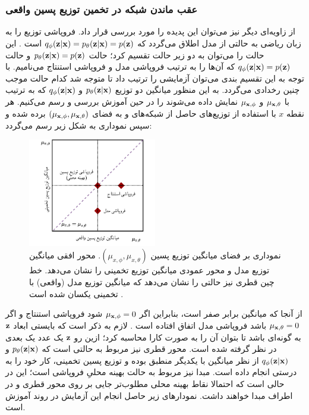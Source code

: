 \subsubsection{عقب ماندن شبکه
	\encoder{}
	در تخمین توزیع پسین واقعی}
از زاویه‌ای دیگر نیز می‌توان این پدیده را مورد بررسی قرار داد. فروپاشی توزیع \posterior{} را به زبان ریاضی به حالتی از مدل اطلاق می‌گردد که
$q_\phi({\bf z}|{\bf x}) = p_\theta ({\bf z}|{\bf x}) = p({\bf z})$
است \cite{vae_lagging}. این حالت را می‌توان به دو زیر حالت تقسیم کرد؛ حالت $p_\theta({\bf z}|{\bf x}) = p({\bf z})$ و حالت $q_\phi({\bf z}|{\bf x}) = p({\bf z})$ که آن‌ها را به ترتیب فروپاشی مدل و فروپاشی استنتاج می‌نامیم. با توجه به این تقسیم بندی می‌توان آزمایشی را ترتیب داد تا متوجه شد کدام حالت موجب چنین رخدادی می‌گردد. به این منظور میانگین دو توزیع $p_\theta({\bf z}|{\bf x})$ و $q_\phi({\bf z}|{\bf x})$ که به ترتیب با $\mu_{{\bf x},\theta}$ و $\mu_{{\bf x},\phi}$ نمایش داده می‌شوند را در حین آموزش بررسی و رسم می‌کنیم. هر نقطه $x$ با استفاده از توزیع‌های حاصل از شبکه‌های \encoder{} و \decoder{} به فضای
$(\mu_{{\bf x},\phi}, \mu_{{\bf x},\theta})$
برده شده و سپس نموداری به شکل زیر رسم می‌گردد:
\begin{figure}[H]
	\centering
	\includegraphics[width=0.5\textwidth]{images/lagging1.pdf}
	\caption{
		نموداری بر فضای میانگین توزیع پسین $(\mu_{x,\phi}, \mu_{x,\theta})$. محور افقی میانگین توزیع \posterior{} مدل و محور عمودی میانگین توزیع \posterior{} تخمینی را نشان می‌دهد. خط چین قطری نیز حالتی را نشان می‌دهد که میانگین توزیع \posterior{} مدل (واقعی) با تخمینی یکسان شده است \cite{infovae}.
	}
\end{figure}

از آنجا که میانگین \priordist{} برابر صفر است، بنابراین اگر $\mu_{{\bf x},\phi} = 0$ شود فروپاشی استنتاج و اگر $\mu_{{\bf x},\theta} = 0$ باشد فروپاشی مدل اتفاق افتاده است \cite{infovae}. لازم به ذکر است که بایستی ابعاد ${\bf z}$ به گونه‌ای باشد تا بتوان آن را به صورت کارا محاسبه کرد؛ ازین رو ${\bf z}$ یک عدد یک بعدی در نظر گرفته شده است. محور قطری نیز مربوط به حالتی است که $p_\theta({\bf z}|{\bf x})$ و $q_\phi({\bf z}|{\bf x})$ از نظر میانگین با یکدیگر منطبق بوده و توزیع پسین تخمینی، کار خود را به درستی انجام داده است. مبدا نیز مربوط به حالت بهینه محلیِ فروپاشی \posteriordist{} است؛ این در حالی است که احتمالا نقاط بهینه محلی مطلوب‌تر جایی بر روی محور قطری و در اطراف مبدا خواهند داشت.
نمودار‌های زیر حاصل انجام این آزمایش در روند آموزش است.

